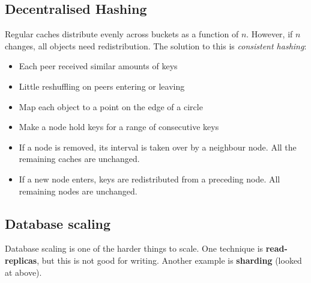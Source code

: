 \documentclass[11pt,a4paper,titlepage,dvipsnames,cmyk]{scrartcl}
\begin{document}
\subsection{Decentralised Hashing}
Regular caches distribute evenly across buckets as a function of $n$. However, if $n$ changes, all objects need redistribution. The solution to this is \textit{consistent hashing}:
\begin{itemize}
    \item Each peer received similar amounts of keys
    \item Little reshuffling on peers entering or leaving
    \item Map each object to a point on the edge of a circle
    \item Make a node hold keys for a range of consecutive keys
    \item If a node is removed, its interval is taken over by a neighbour node. All the remaining caches are unchanged.
    \item If a new node enters, keys are redistributed from a preceding node. All remaining nodes are unchanged.
\end{itemize}

\subsection{Database scaling}
Database scaling is one of the harder things to scale. One technique is \textbf{read-replicas}, but this is not good for writing. Another example is \textbf{sharding} (looked at above). 
\end{document}
